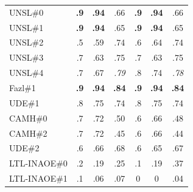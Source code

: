 \begin{itemize}
\begin{table}[t!]
\begin{tabular}{l c c c|c c c}
UNSL\#0 & \textbf{.9} & \textbf{.94} & .66 & \textbf{.9} & \textbf{.94} & .66 \\
UNSL\#1 & \textbf{.9} & \textbf{.94} & .65 & \textbf{.9} & \textbf{.94} & .65 \\
UNSL\#2 & .5 & .59 & .74 & .6 & .64 & .74 \\
UNSL\#3 & .7 & .63 & .75 & .7 & .63 & .75 \\
UNSL\#4 & .7 & .67 & \emph{.79} & .8 & .74 & \emph{.78} \\
\hline\hline
Fazl\#1 & \textbf{.9} & \textbf{.94} & \textbf{.84} & \textbf{.9} & \textbf{.94} & \textbf{.84} \\
UDE\#1 & .8 & .75 & .74 & .8 & .75 & .74 \\
CAMH\#0 & .7 & .72 & .50 & .6 & .66 & .48 \\
CAMH\#2 & .7 & .72 & .45 & .6 & .66 & .44 \\
UDE\#2 & .6 & .66 & .68 & .6 & .65 & .67 \\
LTL-INAOE\#0 & .2 & .19 & .25 & .1 & .19 & .37 \\
LTL-INAOE\#1 & .1 & .06 & .07 & 0 & 0 & .04 \\

\hline
\hline
\end{tabular}

\end{table}


\end{itemize}
